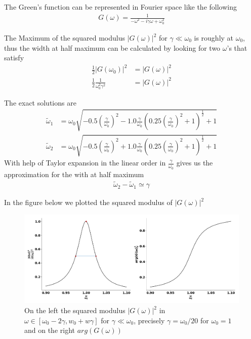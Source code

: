 \documentclass[a4paper]{article}
\begin{document}
The Green's function can be represented in Fourier space like the following
\begin{align}
    G(\omega)= \frac{1}{-\omega^2 - i\gamma \omega + \omega_0^2}
\end{align}

The Maximum of the squared modulus $|G(\omega)|^2$ for $\gamma \ll \omega_0$ is
roughly at $\omega_0$, thus the width at half maximum can be calculated by
looking for two $\omega$'s that satisfy
\begin{align}
    \frac{1}{2}|G(\omega_0)|^2 &= |G(\omega)|^2\\
    \frac{1}{2} \frac{1}{\omega_0^2\gamma^2} &= |G(\omega)|^2
\end{align}

The exact solutions are
\begin{align}
    \tilde{\omega}_1 &= \omega_0\sqrt{-0.5\left(\frac{\gamma}{\omega_0}\right)^2
    - 1.0\frac{\gamma}{\omega_0}(0.25\left(\frac{\gamma}{\omega_0}\right)^2
    + 1)^{\frac{1}{2}} + 1}\\
    \tilde{\omega}_2 &= \omega_0\sqrt{-0.5\left(\frac{\gamma}{\omega_0}\right)^2
    + 1.0\frac{\gamma}{\omega_0}(0.25\left(\frac{\gamma}{\omega_0}\right)^2
    + 1)^{\frac{1}{2}} + 1}
\end{align}
With help of Taylor expansion in the linear order in $\frac{\gamma}{\omega_0}$
gives us the approximation for the with at half maximum
\begin{align}
    \tilde{\omega}_2 - \tilde{\omega}_1 \simeq \gamma
\end{align}

In the figure below we plotted the squared modulus of $|G(\omega)|^2$
\begin{figure}[H]
    \centering
    \includegraphics[width=\textwidth]{section2.png}
    \caption{On the left the squared modulus $|G(\omega)|^2$ in $\omega
\in [\omega_0 - 2\gamma, w_0 + w\gamma]$ for $\gamma \ll \omega_0$, precisely
$\gamma = \omega_0/20$ for $\omega_0 = 1$ and on the right $arg(G(\omega))$}
\end{figure}
\end{document}
